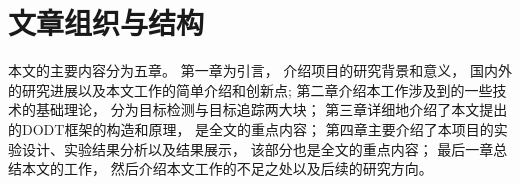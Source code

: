 \section{文章组织与结构}
\label{subsec:structure}
本文的主要内容分为五章。 第一章为引言， 介绍项目的研究背景和意义， 国内外的研究进展以及本文工作的简单介绍和创新点; 第二章介绍本工作涉及到的一些技术的基础理论， 分为目标检测与目标追踪两大块； 第三章详细地介绍了本文提出的DODT框架的构造和原理， 是全文的重点内容； 第四章主要介绍了本项目的实验设计、实验结果分析以及结果展示， 该部分也是全文的重点内容； 最后一章总结本文的工作， 然后介绍本文工作的不足之处以及后续的研究方向。 


\ifprint
	\newpage
	\thispagestyle{empty}
	\mbox{}
	
	\clearpage
	\setcounter{page}{10}
\fi